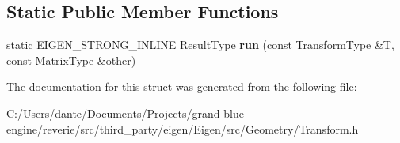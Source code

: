 \subsection*{Static Public Member Functions}
\begin{DoxyCompactItemize}
\item 
\mbox{\label{struct_eigen_1_1internal_1_1transform__right__product__impl_3_01_transform_type_00_01_matrix_type_00_012_00_011_01_4_a8d7df9c44748a733992415d869a6127d}} 
static E\+I\+G\+E\+N\+\_\+\+S\+T\+R\+O\+N\+G\+\_\+\+I\+N\+L\+I\+NE Result\+Type {\bfseries run} (const Transform\+Type \&T, const Matrix\+Type \&other)
\end{DoxyCompactItemize}


The documentation for this struct was generated from the following file\+:\begin{DoxyCompactItemize}
\item 
C\+:/\+Users/dante/\+Documents/\+Projects/grand-\/blue-\/engine/reverie/src/third\+\_\+party/eigen/\+Eigen/src/\+Geometry/Transform.\+h\end{DoxyCompactItemize}
